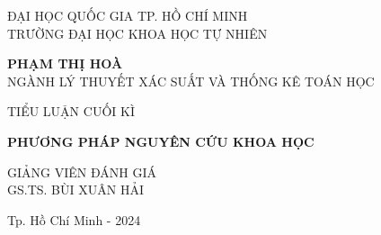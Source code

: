 \begin{center}
\fontsize{14}{16}\selectfont
{ĐẠI HỌC QUỐC GIA TP. HỒ CHÍ MINH}\\
{TRƯỜNG ĐẠI HỌC KHOA HỌC TỰ NHIÊN}\\

\hfill

\vspace*{2cm}

\fontsize{14}{16}\selectfont
{\bf  PHẠM THỊ HOÀ}\\
{NGÀNH LÝ THUYẾT XÁC SUẤT VÀ THỐNG KÊ TOÁN HỌC}

\vspace*{3cm}
\fontsize{20}{22}\selectfont
{TIỂU LUẬN CUỐI KÌ }

\vspace*{1cm}
\fontsize{20}{22}\selectfont
{\bf PHƯƠNG PHÁP NGUYÊN CỨU KHOA HỌC}

\vspace*{3cm}
\fontsize{13}{16}\selectfont
GIẢNG VIÊN ĐÁNH GIÁ\\
GS.TS. BÙI XUÂN HẢI



\vfill
\fontsize{12}{16}\selectfont
{Tp. Hồ Chí Minh - 2024}
\end{center}

